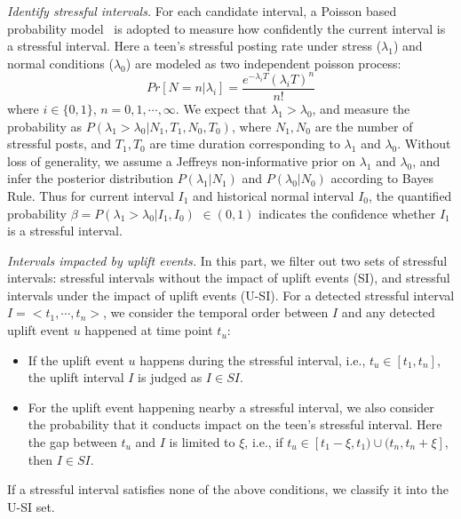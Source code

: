 \emph{Identify stressful intervals.}
For each candidate interval,
a Poisson based probability model~\cite{Li2017Analyzing} is adopted to measure how confidently the current interval is a stressful interval.
Here a teen's stressful posting rate under stress ($\lambda_1$) and normal conditions ($\lambda_0$) are modeled as two independent poisson process:
\begin{equation}
Pr[N=n|\lambda_i]=\frac{e^{-\lambda_i T}{(\lambda_i T)}^n}{n!}
\end{equation}
where $i\in\{0,1\}$, $n=0,1,\cdots,\infty$.
We expect that $\lambda_1 > \lambda_0$, and measure the probability as $P(\lambda_1>\lambda_0|N_1, T_1, N_0, T_0)$,
where $N_1, N_0$ are the number of stressful posts, and $T_1, T_0$ are time duration corresponding to $\lambda_1$ and $\lambda_0$.
Without loss of generality, we assume a Jeffreys non-informative prior on $\lambda_1$ and $\lambda_0$,
and infer the posterior distribution $P(\lambda_1|N_1)$ and $P(\lambda_0|N_0)$ according to Bayes Rule.
Thus for current interval $I_1$ and historical normal interval $I_0$,
the quantified probability $\beta = P(\lambda_1>\lambda_0|I_1,I_0)$ $\in (0,1)$ indicates the confidence whether $I_1$ is a stressful interval.

\emph{Intervals impacted by uplift events.}
In this part, we filter out two sets of stressful intervals: stressful intervals without the impact of uplift events (SI),
and stressful intervals under the impact of uplift events (U-SI).
For a detected stressful interval $I = <t_1,\cdots,t_n>$, we consider the temporal order between $I$ and any detected uplift event $u$ happened at time point $t_u$:
\begin{itemize}
\item If the uplift event $u$ happens during the stressful interval, i.e., $t_u \in [t_1,t_n]$, the uplift interval $I$ is judged as $I \in SI$.
\item For the uplift event happening nearby a stressful interval,
we also consider the probability that it conducts impact on the teen's stressful interval.
Here the gap between $t_u$ and $I$ is limited to $\xi$, i.e.,
if $t_u \in [t_{1}-\xi, t_1)\cup(t_{n},t_{n}+\xi]$, then $I \in SI$.
\end{itemize}
If a stressful interval satisfies none of the above conditions, we classify it into the U-SI set.

